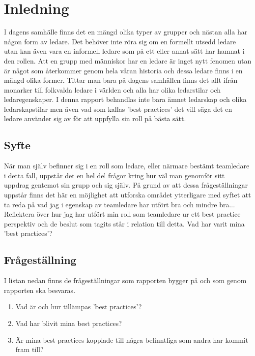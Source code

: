 \section{Inledning}
I dagens samhälle finns det en mängd olika typer av grupper och nästan alla har någon form av ledare. Det behöver inte röra sig om en formellt utsedd ledare utan kan även vara en informell ledare som på ett eller annat sätt har hamnat i den rollen. Att en grupp med människor har en ledare är inget nytt fenomen utan är något som återkommer genom hela våran historia och dessa ledare finns i en mängd olika former. Tittar man bara på dagens samhällen finns det allt ifrån monarker till folkvalda ledare i världen och alla har olika ledarstilar och ledaregenskaper. I denna rapport behandlas inte bara ämnet ledarskap och olika ledarskapstilar men även vad som kallas 'best practices' det vill säga det en ledare använder sig av för att uppfylla sin roll på bästa sätt. 

\subsection{Syfte}
När man själv befinner sig i en roll som ledare, eller närmare bestämt teamledare i detta fall, uppstår det en hel del frågor kring hur väl man genomför sitt uppdrag gentemot sin grupp och sig själv. På grund av att dessa frågeställningar uppstår finns det här en möjlighet att utforska området ytterligare med syftet att ta reda på vad jag i egenskap av teamledare har utfört bra och mindre bra...
\newline \newline
Reflektera över hur jag har utfört min roll som teamledare ur ett best practice perspektiv och de beslut som tagits står i relation till detta. Vad har varit mina 'best practices'?

\subsection{Frågeställning}
I listan nedan finns de frågeställningar som rapporten bygger på och som genom rapporten ska besvaras.
	\begin{enumerate}
		\item Vad är och hur tillämpas 'best practices'?
		\item Vad har blivit mina best practices?
		\item Är mina best practices kopplade till några befinntliga som andra har kommit fram till?
	\end{enumerate}

